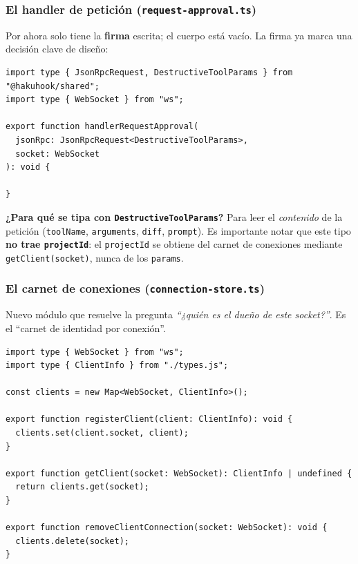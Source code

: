 \documentclass[11pt,a4paper]{article}
\begin{document}
\subsubsection{El handler de petición (\texttt{request-approval.ts})}

Por ahora solo tiene la \textbf{firma} escrita; el cuerpo está vacío. La firma
ya marca una decisión clave de diseño:

\begin{lstlisting}[caption=packages/gateway-hub/src/handlers/request-approval.ts (esqueleto)]
import type { JsonRpcRequest, DestructiveToolParams } from "@hakuhook/shared";
import type { WebSocket } from "ws";

export function handlerRequestApproval(
  jsonRpc: JsonRpcRequest<DestructiveToolParams>,
  socket: WebSocket
): void {

}
\end{lstlisting}

\textbf{¿Para qué se tipa con \texttt{DestructiveToolParams}?} Para leer el
\emph{contenido} de la petición (\texttt{toolName}, \texttt{arguments},
\texttt{diff}, \texttt{prompt}). Es importante notar que este tipo \textbf{no
trae \texttt{projectId}}: el \texttt{projectId} se obtiene del carnet de
conexiones mediante \texttt{getClient(socket)}, nunca de los \texttt{params}.

\subsubsection{El carnet de conexiones (\texttt{connection-store.ts})}

Nuevo módulo que resuelve la pregunta \emph{``¿quién es el dueño de este
socket?''}. Es el ``carnet de identidad por conexión''.

\begin{lstlisting}[caption=packages/gateway-hub/src/connection-store.ts]
import type { WebSocket } from "ws";
import type { ClientInfo } from "./types.js";

const clients = new Map<WebSocket, ClientInfo>();

export function registerClient(client: ClientInfo): void {
  clients.set(client.socket, client);
}

export function getClient(socket: WebSocket): ClientInfo | undefined {
  return clients.get(socket);
}

export function removeClientConnection(socket: WebSocket): void {
  clients.delete(socket);
}
\end{lstlisting}
\end{document}
